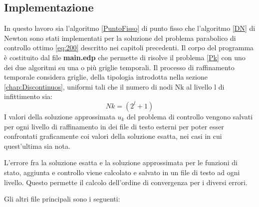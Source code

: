 \subsection{Implementazione}
In questo lavoro sia l'algoritmo \ref{PuntoFisso} di punto fisso che l'algoritmo \ref{DN} di Newton  sono stati implementati per la soluzione del problema parabolico di controllo ottimo \eqref{eq:200} descritto nei capitoli precedenti.
Il corpo del programma è costituito dal file \textbf{main.edp} che permette di risolve il problema \ref{Pk} con uno dei due algoritmi su una o più griglie temporali. Il processo di raffinamento temporale considera griglie, della tipologia introdotta nella sezione \ref{chap:Discontinuos}, uniformi tali che il numero di nodi Nk al livello l di infittimento sia:
\begin{equation}
Nk = ( 2^l + 1 )
\label{Nk}
\end{equation}
I valori della soluzione approssimata $u_k$ del problema di controllo vengono salvati per ogni livello di raffinamento in dei file di testo esterni per poter esser confrontati graficamente coi valori della soluzione esatta, nei casi in cui quest'ultima sia nota.
\par
L'errore fra la soluzione esatta e la soluzione approssimata per le funzioni di stato, aggiunta e controllo viene calcolato e salvato in un file di testo ad ogni livello. Questo permette il calcolo dell'ordine di convergenza per i diversi errori.
\par
Gli altri file principali sono i seguenti:
